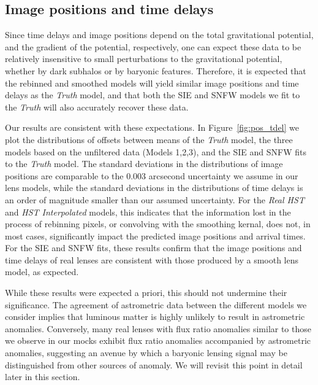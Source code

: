 \subsection{Image positions and time delays}

Since time delays and image positions depend on the total
gravitational potential, and the gradient of the potential,
respectively, one can expect these data to be relatively insensitive
to small perturbations to the gravitational potential, whether by dark
subhalos or by baryonic features. Therefore, it is expected that the
rebinned and smoothed models will yield similar image positions and
time delays as the \textit{Truth} model, and that both the SIE
and SNFW models we fit to the \textit{Truth} will also
accurately recover these data.

Our results are consistent with these expectations. In Figure~\ref{fig:pos_tdel} we plot the distributions of offsets between
means of the \textit{Truth} model, the three models based on
the unfiltered data (Models 1,2,3), and the SIE and SNFW fits to the
\textit{Truth} model. The standard deviations in the
distributions of image positions are comparable to the 0.003 arcsecond
uncertainty we assume in our lens models, while the standard
deviations in the distributions of time delays is an order of
magnitude smaller than our assumed uncertainty. For the
\textit{Real HST} and \textit{HST Interpolated} models, this indicates that
the information lost in the process of rebinning pixels, or convolving
with the smoothing kernal, does not, in most cases, significantly impact the predicted image positions and arrival times. For the SIE and SNFW fits, these results confirm that the image positions and time delays of real lenses are consistent with those produced by a smooth lens model, as expected.

While these results were expected a priori, this should not undermine their significance. The agreement of astrometric data between the different models we consider implies that luminous matter is highly unlikely to result in astrometric anomalies. Conversely, many real lenses with flux ratio anomalies similar to those we observe in our mocks exhibit flux ratio anomalies accompanied by astrometric anomalies, suggesting an avenue by which a baryonic lensing signal may be distinguished from other sources of anomaly. We will revisit this point in detail later in this section.
